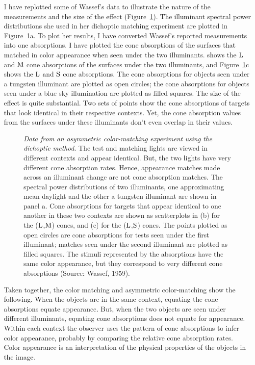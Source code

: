 I have replotted some of Wassef's data to illustrate the nature of the
measurements and the size of the effect (Figure~\ref{f8:wassefShift}).
The illuminant spectral power distributions she used in her dichoptic
matching experiment are plotted in Figure~\ref{f8:wassefShift}a.  To
plot her results, I have converted Wassef's reported measurements into
one absorptions.  I have plotted the cone absorptions of the surfaces
that matched in color appearance when seen under the two illuminants.
shows the $\mbox{L}$ and $\mbox{M}$ cone absorptions of the surfaces under
the two illuminants, and Figure~\ref{f8:wassefShift}c shows the $\mbox{L}$
and $\mbox{S}$ cone absorptions.  The cone absorptions for objects seen
under a tungsten illuminant are plotted as open
circles; the cone absorptions for objects seen under a blue sky
illumination are plotted as filled squares.  The size of the effect is
quite substantial.  Two sets of points show the cone absorptions of
targets that look identical in their respective contexts.  Yet, the
cone absorption values from the surfaces under these illuminants don't
even overlap in their values.
\begin{figure}
\centerline{
}
\caption[Color constancy Effect Size]{
{\em Data from an asymmetric color-matching experiment using the
dichoptic method.}  The test and matching lights are viewed in
different contexts and appear identical.  But, the two lights have
very different cone absorption rates.  Hence, appearance matches made
across an illuminant change are not cone absorption matches.  The
spectral power distributions of two illuminants, one approximating
mean daylight and the other a tungsten illuminant are shown in panel a.
Cone absorptions for targets that appear identical to one another in
these two contexts are shown as scatterplots in (b) for the
($\mbox{L}$,$\mbox{M}$) cones, and (c) for the ($\mbox{L}$,$\mbox{S}$) cones.  The
points plotted as open circles are cone absorptions for tests seen
under the first illuminant; matches seen under the second illuminant
are plotted as filled squares.  The stimuli represented by the
absorptions have the same color appearance, but they correspond to
very different cone absorptions (Source: Wassef, 1959).  }
\label{f8:wassefShift}
\end{figure}

Taken together, the color matching and asymmetric color-matching show
the following.  When the objects are in the same context, equating the
cone absorptions equate appearance.  But, when the two objects are
seen under different illuminants, equating cone absorptions does not
equate for appearance.  Within each context the observer uses the
pattern of cone absorptions to infer color appearance, probably by
comparing the relative cone absorption rates.  Color appearance is an
interpretation of the physical properties of the objects in the image.

